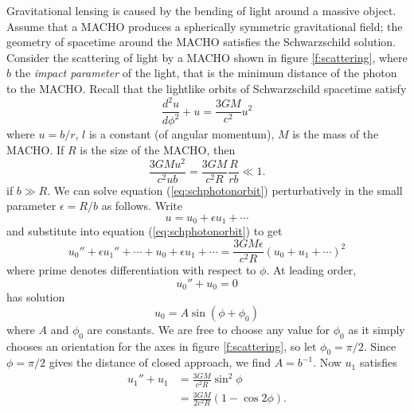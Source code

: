 Gravitational lensing is caused by the bending of light around a massive
object. Assume that a MACHO produces a spherically symmetric gravitational
field; the geometry of spacetime around the MACHO satisfies the Schwarzschild
solution. Consider the scattering of light by a MACHO shown in figure
\ref{f:scattering}, where $b$ the \emph{impact parameter} of the light, that
is the minimum distance of the photon to the MACHO.   Recall that the
lightlike orbits of Schwarzschild spacetime satisfy\cite{Wald:1984}
\begin{equation}
\frac{d^2 u}{d\phi^2} + u = \frac{3GM}{c^2}u^2
\label{eq:schphotonorbit}
\end{equation}
where $u = b/r$, $l$ is a constant (of angular momentum), $M$ is the mass
of the MACHO. If $R$ is the size of the
MACHO, then
\begin{equation}
\frac{3GMu^2}{c^2ub} = \frac{3GM}{c^2R} \frac{R}{rb} \ll 1.
\end{equation}
if $b \gg R$. We can solve equation (\ref{eq:schphotonorbit}) perturbatively
in the small parameter $\epsilon = R / b$ as follows. Write
\begin{equation}
u = u_0 + \epsilon u_1 + \cdots
\end{equation}
and substitute into equation (\ref{eq:schphotonorbit}) to get
\begin{equation}
u_0'' + \epsilon u_1'' + \cdots + u_0 + \epsilon u_1 + \cdots = \frac{3GM\epsilon}{c^2R}\left(u_0 + u_1 +
\cdots\right)^2 
\end{equation}
where prime denotes differentiation with respect to $\phi$. At leading order,
\begin{equation}
u_0'' + u_0 = 0
\end{equation}
has solution
\begin{equation}
u_0 = A \sin \left(\phi + \phi_0\right)
\end{equation}
where $A$ and $\phi_0$ are constants. We are free to choose any value for
$\phi_0$ as it simply chooses an orientation for the axes in figure
\ref{f:scattering}, so let $\phi_0 = \pi /2$. Since $\phi = \pi / 2$
gives the distance of closed approach, we find $A = b^{-1}$. Now $u_1$
satisfies
\begin{equation}
\begin{split}
u_1'' + u_1 &= \frac{3GM}{c^2 R} \sin^2 \phi \\
&= \frac{3GM}{2c^2 R}\left(1 - \cos 2\phi\right).
\label{eq:u1eq}
\end{split}
\end{equation}

